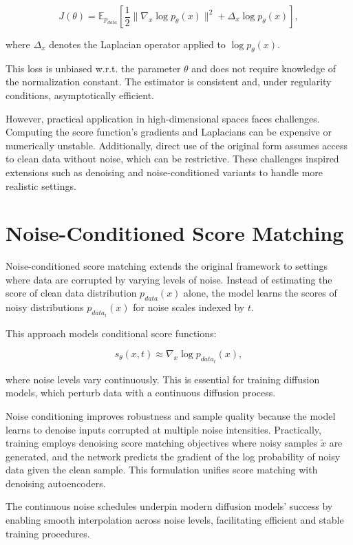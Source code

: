 \documentclass[a4paper,12pt,oneside]{memoir}
\begin{document}
\[
J(\theta) = \mathbb{E}_{p_{data}} \left[ \frac{1}{2} \| \nabla_x \log p_\theta(x) \|^2 + \Delta_x \log p_\theta(x) \right],
\]

where \( \Delta_x \) denotes the Laplacian operator applied to \( \log p_\theta(x) \).

This loss is unbiased w.r.t. the parameter \( \theta \) and does not require knowledge of the normalization constant. The estimator is consistent and, under regularity conditions, asymptotically efficient.

However, practical application in high-dimensional spaces faces challenges. Computing the score function's gradients and Laplacians can be expensive or numerically unstable. Additionally, direct use of the original form assumes access to clean data without noise, which can be restrictive. These challenges inspired extensions such as denoising and noise-conditioned variants to handle more realistic settings.

\section{Noise-Conditioned Score Matching}

Noise-conditioned score matching extends the original framework to settings where data are corrupted by varying levels of noise. Instead of estimating the score of clean data distribution \( p_{data}(x) \) alone, the model learns the scores of noisy distributions \( p_{data_t}(x) \) for noise scales indexed by \( t \).

This approach models conditional score functions:

\[
s_\theta(x, t) \approx \nabla_x \log p_{data_t}(x),
\]

where noise levels vary continuously. This is essential for training diffusion models, which perturb data with a continuous diffusion process.

Noise conditioning improves robustness and sample quality because the model learns to denoise inputs corrupted at multiple noise intensities. Practically, training employs denoising score matching objectives where noisy samples \( \tilde{x} \) are generated, and the network predicts the gradient of the log probability of noisy data given the clean sample. This formulation unifies score matching with denoising autoencoders.

The continuous noise schedules underpin modern diffusion models' success by enabling smooth interpolation across noise levels, facilitating efficient and stable training procedures.
\end{document}
